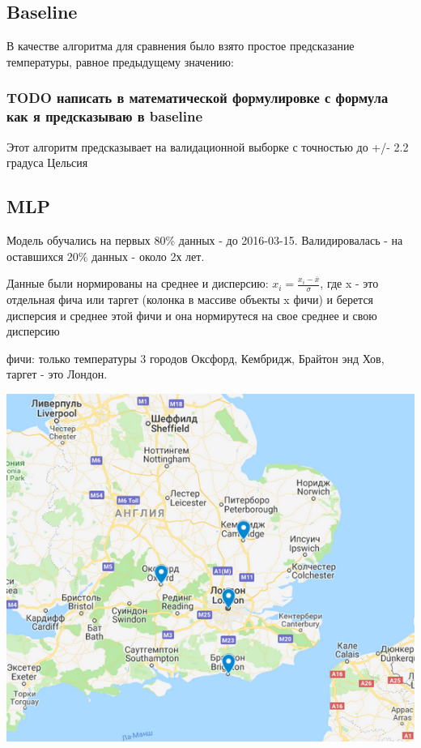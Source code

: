 \documentclass[11pt]{article}
\begin{document}
\subsection{Baseline}
\label{sec:orgef46f31}
В качестве алгоритма для сравнения было взято простое предсказание температуры, равное предыдущему значению:
\subsubsection{{\bfseries\sffamily TODO} написать в математической формулировке с формула как я предсказываю в baseline}
\label{sec:orga29cc2b}

Этот алгоритм предсказывает на валидационной выборке с точностью до +/- 2.2 градуса Цельсия

\subsection{MLP}
\label{sec:orge0bdd4e}
Модель обучались на первых 80\% данных - до 2016-03-15. Валидировалась - на оставшихся 20\% данных - около 2х лет.

Данные были нормированы на среднее и дисперсию: \(x_{i} = \frac{x_{i} - \overline{x}}{\sigma}\), где x - это отдельная
фича или таргет (колонка в массиве объекты x фичи) и берется дисперсия и среднее этой фичи и она нормирутеся на свое
среднее и свою дисперсию

фичи: только температуры 3 городов Оксфорд, Кембридж, Брайтон энд Хов, таргет - это Лондон.

\begin{center}
\includegraphics[width=15cm]{./pics/map city predict.png}
\end{center} 
\end{document}

